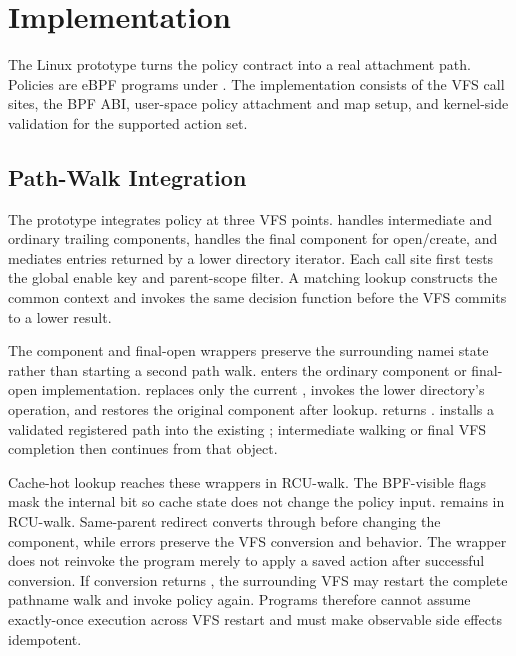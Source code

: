 \section{Implementation}
\label{sec:implementation}

The Linux prototype turns the policy contract into a real
 attachment path. Policies are eBPF programs under
. The implementation consists of the VFS call sites,
the BPF ABI, user-space policy attachment and map setup, and kernel-side
validation for the supported action set.

\subsection{Path-Walk Integration}

The prototype integrates policy at three VFS points. 
handles intermediate and ordinary trailing components,
 handles the final component for open/create, and
 mediates entries returned by a lower directory iterator.
Each call site first tests the global enable key and parent-scope filter. A
matching lookup constructs the common context and invokes the same
 decision function before the VFS commits to a lower
result.

The component and final-open wrappers preserve the surrounding namei state
rather than starting a second path walk.  enters the ordinary
component or final-open implementation.  replaces only the
current , invokes the lower directory's  operation,
and restores the original component after lookup.  returns
.  installs a validated registered path into
the existing ; intermediate walking or final VFS completion
then continues from that object.

Cache-hot lookup reaches these wrappers in RCU-walk. The BPF-visible flags mask
the internal  bit so cache state does not change the policy
input.  remains in RCU-walk. Same-parent redirect converts through
 before changing the component, while errors preserve
the VFS conversion and  behavior. The wrapper does not
reinvoke the program merely to apply a saved action after successful
conversion. If conversion returns , the surrounding VFS may
restart the complete pathname walk and invoke policy again. Programs therefore
cannot assume exactly-once execution across VFS restart and must make
observable side effects idempotent.

